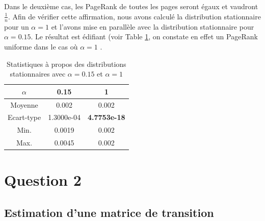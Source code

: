 \documentclass[a4paper,titlepage]{report}
\begin{document}
\paragraph{}
Dans le deuxième cas, les PageRank de toutes les pages seront égaux et vaudront $\frac{1}{n}$. Afin de vérifier cette affirmation, nous avons calculé la distribution stationnaire pour un $\alpha = 1$ et l'avons mise en parallèle avec la distribution stationnaire pour $\alpha = 0.15$. Le résultat est édifiant (voir Table \ref{tab:alpha_comp}, on constate en effet un PageRank uniforme dans le cas où $\alpha = 1$ .
\begin{table}[h]
	\center
	\begin{tabular}{|c|c|c|}
		\hline 
		$\alpha$   & 0.15  & 1 \\
		\hline
	 	Moyenne    & 0.002 & 0.002\\
	 	Ecart-type & 1.3000e-04 & \textbf{4.7753e-18} \\
	 	Min.       & 0.0019 & 0.002\\
	 	Max.       & 0.0045 & 0.002\\
	 	\hline
	\end{tabular}
	\caption{Statistiques à propos des distributions stationnaires avec $\alpha = 0.15$ et $\alpha = 1$}
	\label{tab:alpha_comp}
\end{table}
\chapter{Question 2}
\section{Estimation d'une matrice de transition}
\end{document}
